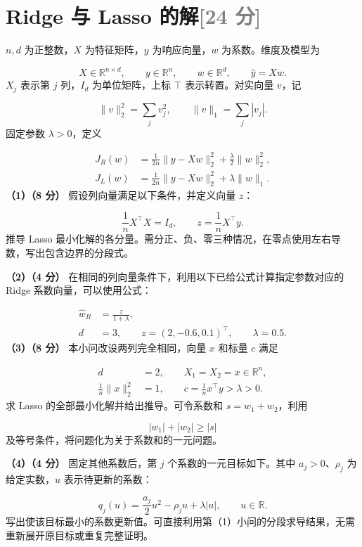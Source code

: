 \documentclass[11pt,a4paper]{article}
\begin{document}
\par\addvspace{1.2em}\noindent\begin{minipage}{\linewidth}
\section[Ridge 与 Lasso 的解（24 分）]{Ridge 与 Lasso 的解\hfill\textcolor{gray}{[24 分]}}
$n,d$ 为正整数，$X$ 为特征矩阵，$y$ 为响应向量，$w$ 为系数。维度及模型为


\[
X\in\mathbb R^{n\times d},\qquad y\in\mathbb R^n,\qquad
w\in\mathbb R^d,\qquad \widehat y=Xw.
\]
$X_j$ 表示第 $j$ 列，$I_d$ 为单位矩阵，上标 $\top$ 表示转置。对实向量 $v$，记


\[
\|v\|_2^2=\sum_jv_j^2,\qquad \|v\|_1=\sum_j|v_j|.
\]
固定参数 $\lambda>0$，定义


\[
\begin{aligned}
J_R(w)&=\frac1{2n}\|y-Xw\|_2^2+\frac\lambda2\|w\|_2^2,\\
J_L(w)&=\frac1{2n}\|y-Xw\|_2^2+\lambda\|w\|_1.
\end{aligned}
\]
\textbf{（1）（8 分）} 假设列向量满足以下条件，并定义向量 $z$：


\[
\frac1nX^\top X=I_d,\qquad z=\frac1nX^\top y.
\]
推导 Lasso 最小化解的各分量。需分正、负、零三种情况，在零点使用左右导数，写出包含边界的分段式。

\textbf{（2）（4 分）} 在相同的列向量条件下，利用以下已给公式计算指定参数对应的 Ridge 系数向量，可以使用公式：


\[
\begin{aligned}
\widehat w_R&=\frac{z}{1+\lambda},\\
d&=3,\qquad z=(2,-0.6,0.1)^\top,\qquad \lambda=0.5.
\end{aligned}
\]
\textbf{（3）（8 分）} 本小问改设两列完全相同，向量 $x$ 和标量 $c$ 满足


\[
\begin{aligned}
d&=2,\qquad X_1=X_2=x\in\mathbb R^n,\\
\frac1n\|x\|_2^2&=1,\qquad c=\frac1nx^\top y>\lambda>0.
\end{aligned}
\]
求 Lasso 的全部最小化解并给出推导。可令系数和 $s=w_1+w_2$，利用


\[
|w_1|+|w_2|\geq|s|
\]
及等号条件，将问题化为关于系数和的一元问题。

\textbf{（4）（4 分）} 固定其他系数后，第 $j$ 个系数的一元目标如下。其中 $a_j>0$、$\rho_j$ 为给定实数，$u$ 表示待更新的系数：


\[
q_j(u)=\frac{a_j}{2}u^2-\rho_ju+\lambda|u|,\qquad u\in\mathbb R.
\]
写出使该目标最小的系数更新值。可直接利用第（1）小问的分段求导结果，无需重新展开原目标或重复完整证明。


\end{minipage}\par
\end{document}
